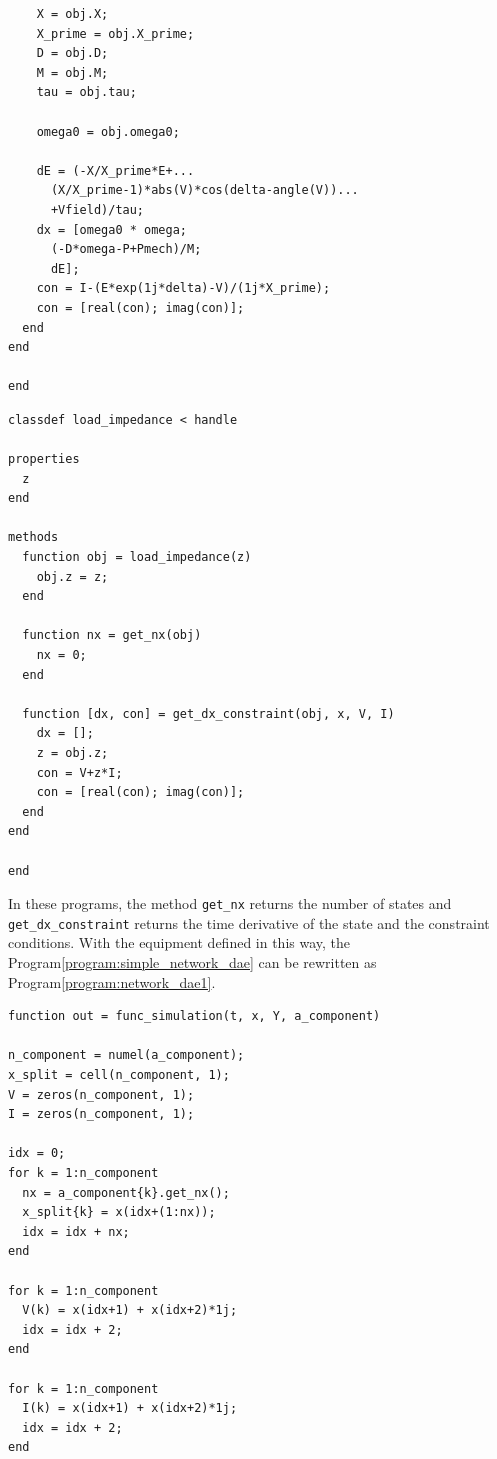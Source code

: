 \documentclass[tombow,dvipdfmx]{corona-a5-1.1}
\begin{document}
\begin{例}
\begin{PROGRAMA}[count,title={generator.m}]
\begin{verbatim}
    X = obj.X;
    X_prime = obj.X_prime;
    D = obj.D;
    M = obj.M;
    tau = obj.tau;

    omega0 = obj.omega0;

    dE = (-X/X_prime*E+...
      (X/X_prime-1)*abs(V)*cos(delta-angle(V))...
      +Vfield)/tau;
    dx = [omega0 * omega;
      (-D*omega-P+Pmech)/M;
      dE];
    con = I-(E*exp(1j*delta)-V)/(1j*X_prime);
    con = [real(con); imag(con)];
  end
end
  
end
\end{verbatim}
\end{PROGRAMA}


\smallskip
\begin{PROGRAMA}[count,title={load\_impedance.m}]\label{program:load}
\begin{verbatim}
classdef load_impedance < handle
  
properties
  z
end

methods
  function obj = load_impedance(z)
    obj.z = z;
  end

  function nx = get_nx(obj)
    nx = 0;
  end

  function [dx, con] = get_dx_constraint(obj, x, V, I)
    dx = [];
    z = obj.z;
    con = V+z*I;
    con = [real(con); imag(con)];
  end
end

end
\end{verbatim}
\end{PROGRAMA}

In these programs, the method \verb|get_nx| returns the number of states and \verb|get_dx_constraint| returns the time derivative of the state and the constraint conditions.
With the equipment defined in this way, the Program\nobreak\ref{program:simple_network_dae} can be rewritten as Program\nobreak\ref{program:network_dae1}.

\smallskip
\begin{PROGRAMA}[count,title={func\_simulation.m}]\label{program:network_dae1}
  \begin{verbatim}
function out = func_simulation(t, x, Y, a_component)

n_component = numel(a_component);
x_split = cell(n_component, 1);
V = zeros(n_component, 1);
I = zeros(n_component, 1);

idx = 0;
for k = 1:n_component
  nx = a_component{k}.get_nx();
  x_split{k} = x(idx+(1:nx));
  idx = idx + nx;
end

for k = 1:n_component
  V(k) = x(idx+1) + x(idx+2)*1j;
  idx = idx + 2;
end

for k = 1:n_component
  I(k) = x(idx+1) + x(idx+2)*1j;
  idx = idx + 2;
end


\end{verbatim}
\end{PROGRAMA}
\end{例}
\end{document}
